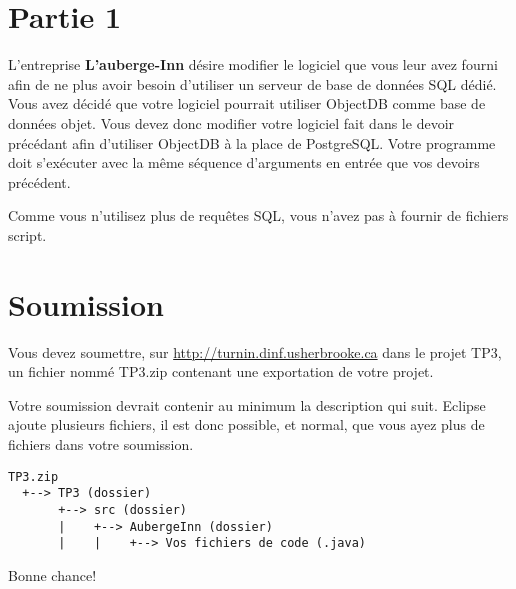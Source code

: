 \documentclass[12pt]{article}
\begin{document}
\section{Partie 1}

L'entreprise \textbf{L'auberge-Inn} désire modifier le logiciel que vous leur avez fourni afin de ne plus avoir besoin d'utiliser un serveur de base de données SQL dédié. Vous avez décidé que votre logiciel pourrait utiliser ObjectDB comme base de données objet. Vous devez donc modifier votre logiciel fait dans le devoir précédant afin d'utiliser ObjectDB à la place de PostgreSQL. Votre programme doit s'exécuter avec la même séquence d'arguments en entrée que vos devoirs précédent.

Comme vous n'utilisez plus de requêtes SQL, vous n'avez pas à fournir de fichiers script.

\section{Soumission}

Vous devez soumettre, sur \url{http://turnin.dinf.usherbrooke.ca} dans le projet TP3, un fichier nommé TP3.zip contenant une exportation de votre projet.

Votre soumission devrait contenir au minimum la description qui suit. Eclipse ajoute
plusieurs fichiers, il est donc possible, et normal, que vous ayez plus de fichiers dans votre soumission.

\begin{verbatim}
TP3.zip
  +--> TP3 (dossier)
       +--> src (dossier)
       |    +--> AubergeInn (dossier)
       |    |    +--> Vos fichiers de code (.java)
\end{verbatim}

Bonne chance!
\end{document}
